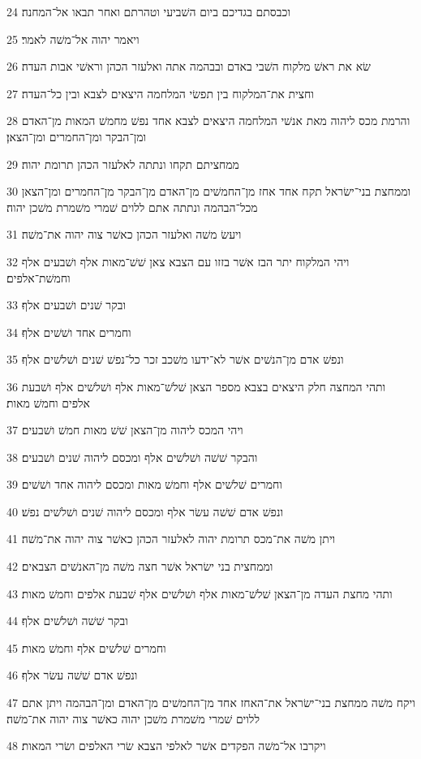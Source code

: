 \par 24 וכבסתם בגדיכם ביום השׁביעי וטהרתם ואחר תבאו אל־המחנה׃
\par 25 ויאמר יהוה אל־משׁה לאמר׃
\par 26 שׂא את ראשׁ מלקוח השׁבי באדם ובבהמה אתה ואלעזר הכהן וראשׁי אבות העדה׃
\par 27 וחצית את־המלקוח בין תפשׂי המלחמה היצאים לצבא ובין כל־העדה׃
\par 28 והרמת מכס ליהוה מאת אנשׁי המלחמה היצאים לצבא אחד נפשׁ מחמשׁ המאות מן־האדם ומן־הבקר ומן־החמרים ומן־הצאן׃
\par 29 ממחציתם תקחו ונתתה לאלעזר הכהן תרומת יהוה׃
\par 30 וממחצת בני־ישׂראל תקח אחד אחז מן־החמשׁים מן־האדם מן־הבקר מן־החמרים ומן־הצאן מכל־הבהמה ונתתה אתם ללוים שׁמרי משׁמרת משׁכן יהוה׃
\par 31 ויעשׂ משׁה ואלעזר הכהן כאשׁר צוה יהוה את־משׁה׃
\par 32 ויהי המלקוח יתר הבז אשׁר בזזו עם הצבא צאן שׁשׁ־מאות אלף ושׁבעים אלף וחמשׁת־אלפים׃
\par 33 ובקר שׁנים ושׁבעים אלף׃
\par 34 וחמרים אחד ושׁשׁים אלף׃
\par 35 ונפשׁ אדם מן־הנשׁים אשׁר לא־ידעו משׁכב זכר כל־נפשׁ שׁנים ושׁלשׁים אלף׃
\par 36 ותהי המחצה חלק היצאים בצבא מספר הצאן שׁלשׁ־מאות אלף ושׁלשׁים אלף ושׁבעת אלפים וחמשׁ מאות׃
\par 37 ויהי המכס ליהוה מן־הצאן שׁשׁ מאות חמשׁ ושׁבעים׃
\par 38 והבקר שׁשׁה ושׁלשׁים אלף ומכסם ליהוה שׁנים ושׁבעים׃
\par 39 וחמרים שׁלשׁים אלף וחמשׁ מאות ומכסם ליהוה אחד ושׁשׁים׃
\par 40 ונפשׁ אדם שׁשׁה עשׂר אלף ומכסם ליהוה שׁנים ושׁלשׁים נפשׁ׃
\par 41 ויתן משׁה את־מכס תרומת יהוה לאלעזר הכהן כאשׁר צוה יהוה את־משׁה׃
\par 42 וממחצית בני ישׂראל אשׁר חצה משׁה מן־האנשׁים הצבאים׃
\par 43 ותהי מחצת העדה מן־הצאן שׁלשׁ־מאות אלף ושׁלשׁים אלף שׁבעת אלפים וחמשׁ מאות׃
\par 44 ובקר שׁשׁה ושׁלשׁים אלף׃
\par 45 וחמרים שׁלשׁים אלף וחמשׁ מאות׃
\par 46 ונפשׁ אדם שׁשׁה עשׂר אלף׃
\par 47 ויקח משׁה ממחצת בני־ישׂראל את־האחז אחד מן־החמשׁים מן־האדם ומן־הבהמה ויתן אתם ללוים שׁמרי משׁמרת משׁכן יהוה כאשׁר צוה יהוה את־משׁה׃
\par 48 ויקרבו אל־משׁה הפקדים אשׁר לאלפי הצבא שׂרי האלפים ושׂרי המאות׃
